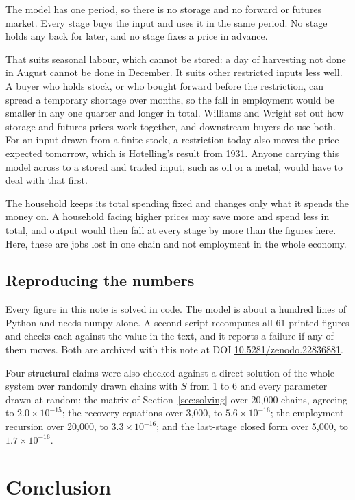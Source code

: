 \documentclass[11pt,a4paper]{article}
\begin{document}
The model has one period, so there is no storage and no forward or futures market. Every stage buys the input and uses it in the same period. No stage holds any back for later, and no stage fixes a price in advance.

That suits seasonal labour, which cannot be stored: a day of harvesting not done in August cannot be done in December. It suits other restricted inputs less well. A buyer who holds stock, or who bought forward before the restriction, can spread a temporary shortage over months, so the fall in employment would be smaller in any one quarter and longer in total. Williams and Wright set out how storage and futures prices work together, and downstream buyers do use both. For an input drawn from a finite stock, a restriction today also moves the price expected tomorrow, which is Hotelling's result from 1931. Anyone carrying this model across to a stored and traded input, such as oil or a metal, would have to deal with that first.

The household keeps its total spending fixed and changes only what it spends the money on. A household facing higher prices may save more and spend less in total, and output would then fall at every stage by more than the figures here. Here, these are jobs lost in one chain and not employment in the whole economy.

\subsection{Reproducing the numbers}

Every figure in this note is solved in code. The model is about a hundred lines of Python and needs numpy alone. A second script recomputes all 61 printed figures and checks each against the value in the text, and it reports a failure if any of them moves. Both are archived with this note at DOI \href{https://doi.org/10.5281/zenodo.22836881}{10.5281/zenodo.22836881}.

Four structural claims were also checked against a direct solution of the whole system over randomly drawn chains with $S$ from 1 to 6 and every parameter drawn at random: the matrix of Section~\ref{sec:solving} over 20,000 chains, agreeing to $2.0 \times 10^{-15}$; the recovery equations over 3,000, to $5.6 \times 10^{-16}$; the employment recursion over 20,000, to $3.3 \times 10^{-16}$; and the last-stage closed form over 5,000, to $1.7 \times 10^{-16}$.

\section{Conclusion}
\label{sec:conc}
\end{document}
